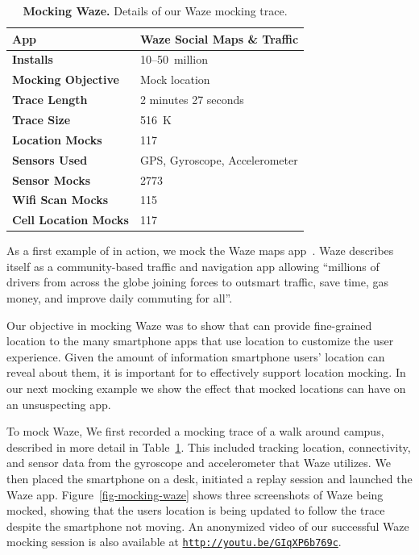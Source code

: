 \begin{table}
\begin{tabularx}{3.33in}{lX}
\textbf{App} & Waze Social Maps \& Traffic \\ \toprule
\textbf{Installs} & 10--50~million \\
\textbf{Mocking Objective} & Mock location \\ \midrule
\textbf{Trace Length} & 2 minutes 27 seconds \\
\textbf{Trace Size} & 516~K \\
\textbf{Location Mocks} & 117 \\
\textbf{Sensors Used} & {\small GPS, Gyroscope, Accelerometer} \\
\textbf{Sensor Mocks} & 2773 \\
\textbf{Wifi Scan Mocks} & 115 \\
\textbf{Cell Location Mocks} & 117 \\
\end{tabularx}

\caption{\textbf{Mocking Waze.} Details of our Waze mocking trace.}

\label{table-mocking-waze}

\end{table}

As a first example of \PocketMocker{} in action, we mock the Waze maps
app~\cite{waze-playstore-url}. Waze describes itself as a community-based
traffic and navigation app allowing ``millions of drivers from across the
globe joining forces to outsmart traffic, save time, gas money, and improve
daily commuting for all''.

Our objective in mocking Waze was to show that \PocketMocker{} can provide
fine-grained location to the many smartphone apps that use location to
customize the user experience. Given the amount of information smartphone
users' location can reveal about them, it is important for \PocketMocker{} to
effectively support location mocking. In our next mocking example we show the
effect that mocked locations can have on an unsuspecting app.

To mock Waze, We first recorded a mocking trace of a walk around campus,
described in more detail in Table~\ref{table-mocking-waze}.  This included
tracking location, connectivity, and sensor data from the gyroscope and
accelerometer that Waze utilizes. We then placed the smartphone on a desk,
initiated a replay session and launched the Waze app.
Figure~\ref{fig-mocking-waze} shows three screenshots of Waze being mocked,
showing that the users location is being updated to follow the trace despite
the smartphone not moving. An anonymized video of our successful Waze mocking
session is also available at
\hyperlink{http://youtu.be/GIqXP6b769c}{\texttt{http://youtu.be/GIqXP6b769c}}.

